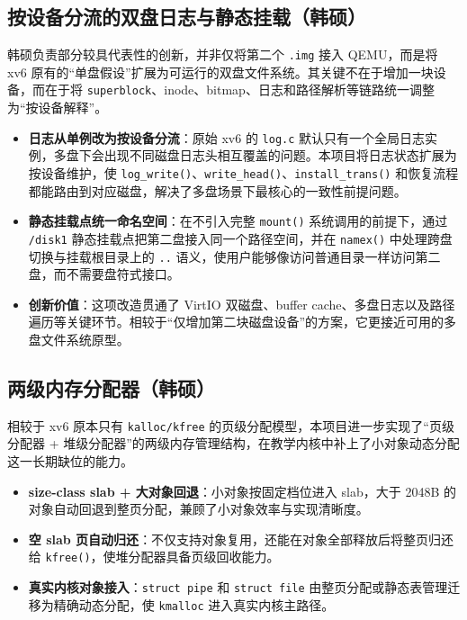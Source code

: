 \documentclass[12pt,a4paper]{ctexart}
\begin{document}
\subsection{按设备分流的双盘日志与静态挂载（韩硕）}

韩硕负责部分较具代表性的创新，并非仅将第二个 \texttt{.img} 接入 QEMU，而是将 xv6 原有的“单盘假设”扩展为可运行的双盘文件系统。其关键不在于增加一块设备，而在于将 \texttt{superblock}、inode、bitmap、日志和路径解析等链路统一调整为“按设备解释”。

\begin{itemize}
  \item \textbf{日志从单例改为按设备分流}：原始 xv6 的 \texttt{log.c} 默认只有一个全局日志实例，多盘下会出现不同磁盘日志头相互覆盖的问题。本项目将日志状态扩展为按设备维护，使 \texttt{log\_write()}、\texttt{write\_head()}、\texttt{install\_trans()} 和恢复流程都能路由到对应磁盘，解决了多盘场景下最核心的一致性前提问题。
  \item \textbf{静态挂载点统一命名空间}：在不引入完整 \texttt{mount()} 系统调用的前提下，通过 \texttt{/disk1} 静态挂载点把第二盘接入同一个路径空间，并在 \texttt{namex()} 中处理跨盘切换与挂载根目录上的 \texttt{..} 语义，使用户能够像访问普通目录一样访问第二盘，而不需要盘符式接口。
  \item \textbf{创新价值}：这项改造贯通了 VirtIO 双磁盘、buffer cache、多盘日志以及路径遍历等关键环节。相较于“仅增加第二块磁盘设备”的方案，它更接近可用的多盘文件系统原型。
\end{itemize}

\subsection{两级内存分配器（韩硕）}

相较于 xv6 原本只有 \texttt{kalloc/kfree} 的页级分配模型，本项目进一步实现了“页级分配器 + 堆级分配器”的两级内存管理结构，在教学内核中补上了小对象动态分配这一长期缺位的能力。

\begin{itemize}
  \item \textbf{size-class slab + 大对象回退}：小对象按固定档位进入 slab，大于 2048B 的对象自动回退到整页分配，兼顾了小对象效率与实现清晰度。
  \item \textbf{空 slab 页自动归还}：不仅支持对象复用，还能在对象全部释放后将整页归还给 \texttt{kfree()}，使堆分配器具备页级回收能力。
  \item \textbf{真实内核对象接入}：\texttt{struct pipe} 和 \texttt{struct file} 由整页分配或静态表管理迁移为精确动态分配，使 \texttt{kmalloc} 进入真实内核主路径。
\end{itemize}
\end{document}
